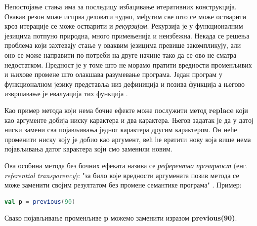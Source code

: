 \documentclass[12pt,oneside]{memoir}
\begin{document}
\par Непостојање стања има за последицу избацивање итеративних конструкција. Овакав резон може испрва деловати чудно, међутим све што се може остварити кроз итерације се може остварити и \textit{рекурзијом}. Рекурзија је у функционалним језицима потпуно природна, много примењенија и неизбежна. Некада се решења проблема који захтевају стање у оваквим језицима превише закомпликују, али оно се може направити по потреби на друге начине тако да се ово не сматра недостатком. Предност је у томе што не морамо пратити вредности променљивих и њихове промене што олакшава разумевање програма. Један програм у функционалном језику представља низ дефиниција и позива функција а његово извршавање је евалуација тих функција \cite{funkMilena}.
\par Као пример метода који нема бочне ефекте може послужити метод \textbf{replace} који као аргументе добија ниску карактера и два карактера. Његов задатак је да у датој ниски замени сва појављивања једног карактера другим карактером. Он неће променити ниску коју је добио као аргумент, већ ће вратити нову која више нема појављивања датог карактера који смо заменили новим.  
\par Ова особина метода без бочних ефеката назива се \textit{референтна прозирност} (енг. \textit{referential transparency}): "за било које вредности аргумената позив метода се може заменити својим резултатом без промене семантике програма" \cite{progInScala}. Пример:

\begin{lstlisting}[language=Scala]
val p = previous(90)
\end{lstlisting}
Свако појављивање променљиве \textbf{p} можемо заменити изразом \textbf{previous(90)}.
\end{document}
